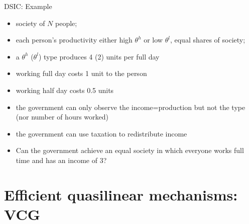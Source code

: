 \documentclass[english,10pt
,aspectratio=169
]{beamer}
\begin{document}
\begin{frame}{DSIC: Example}
\begin{example}[Communism]
	\begin{itemize}
		\item society of $N$ people;
		\item each person's productivity either high $\theta^h$ or low $\theta^l$, equal shares of society;
		\item a $\theta^{h}$ ($\theta^{l}$) type produces 4 (2) units per full day
		\item working full day costs 1 unit to the person
		\item working half day costs 0.5 units
		\item the government can only observe the income=production but not the type (nor number of hours worked)
		\item the government can use taxation to redistribute income
		\item Can the government achieve an equal society in which everyone works full time and has an income of 3?
	\end{itemize}
\end{example}
\end{frame}




\section{Efficient quasilinear mechanisms: VCG}
\end{document}
